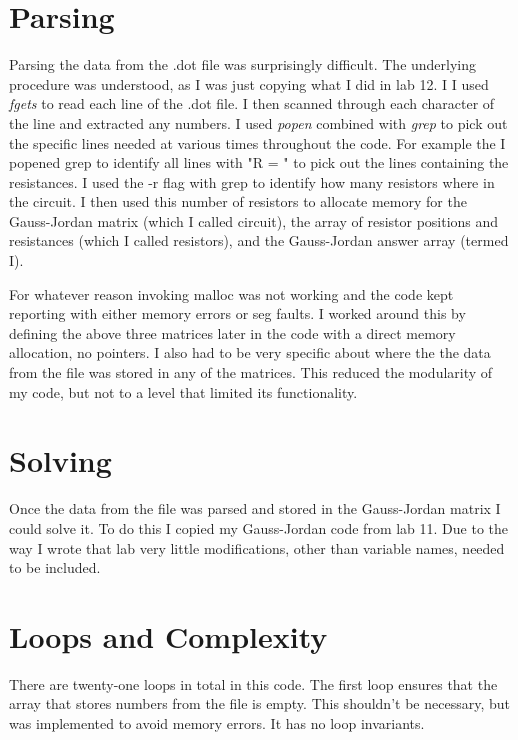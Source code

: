 \documentclass{article}
\begin{document}
\section{Parsing}
Parsing the data from the .dot file was surprisingly difficult. The underlying procedure was understood, as I was just copying what I did in lab 12. I I used \textit{fgets} to read each line of the .dot file. I then scanned through each character of the line and extracted any numbers. I used \textit{popen} combined with \textit{grep} to pick out the specific lines needed at various times throughout the code. For example the I popened grep to identify all lines with "R = " to pick out the lines containing the resistances. I used the -r flag with grep to identify how many resistors where in the circuit. I then used this number of resistors to allocate memory for the Gauss-Jordan matrix (which I called circuit), the array of resistor positions and resistances (which I called resistors), and the Gauss-Jordan answer array (termed I). 

For whatever reason invoking malloc was not working and the code kept reporting with either memory errors or seg faults. I worked around this by defining the above three matrices later in the code with a direct memory allocation, no pointers. I also had to be very specific about where the the data from the file was stored in any of the matrices. This reduced the modularity of my code, but not to a level that limited its functionality.

\section{Solving}
Once the data from the file was parsed and stored in the Gauss-Jordan matrix I could solve it. To do this I copied my Gauss-Jordan code from lab 11. Due to the way I wrote that lab very little modifications, other than variable names, needed to be included.

\section{Loops and Complexity}
There are twenty-one loops in total in this code. The first loop ensures that the array that stores numbers from the file is empty. This shouldn't be necessary, but was implemented to avoid memory errors. It has no loop invariants.
\end{document}
